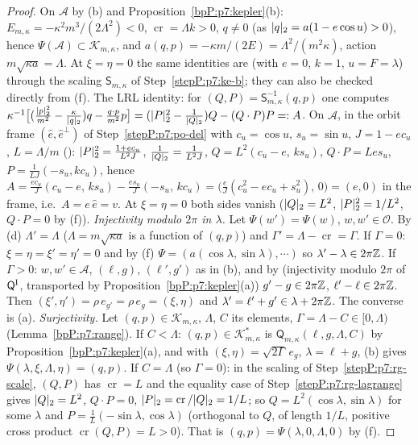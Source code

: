 \begin{proof}
\label{stepP:p7:po-el} On $\mathcal A$ by (b) and Proposition~\ref{bpP:p7:kepler}(b): $E_{m,\kappa}=-\kappa^2m^3/(2\Lambda^2)<0$, $\operatorname{cr}=\Lambda k>0$, $q\ne0$ (as $\lvert q\rvert_2=a(1-e\cos u)>0$), hence $\Psi(\mathcal A)\subset\mathcal K_{m,\kappa}$, and $a(q,p)=-\kappa m/(2E)=\Lambda^2/(m^2\kappa)$, action $m\sqrt{\kappa a}=\Lambda$. At $\xi=\eta=0$ the same identities are  (with $e=0$, $k=1$, $u=F=\lambda$) through the scaling $\mathsf S_{m,\kappa}$ of Step~\ref{stepP:p7:ke-b}; they can also be checked directly from (f). The LRL identity: for $(Q,P)=\mathsf S_{m,\kappa}^{-1}(q,p)$ one computes $\kappa^{-1}\bigl[(\frac{\lvert p\rvert_2^2}{m^2}-\frac\kappa{\lvert q\rvert_2})q-\frac{q\cdot p}{m^2}p\bigr]=(\lvert P\rvert_2^2-\frac1{\lvert Q\rvert_2})Q-(Q\cdot P)P=:A$. On $\mathcal A$, in the orbit frame $(\hat e,\hat e^\perp)$ of Step~\ref{stepP:p7:po-del} with $c_u=\cos u$, $s_u=\sin u$, $J=1-ec_u$, $L=\Lambda/m$ (): $\lvert P\rvert_2^2=\frac{1+ec_u}{L^2J}$, $\frac1{\lvert Q\rvert_2}=\frac1{L^2J}$, $Q=L^2(c_u-e,\,ks_u)$, $Q\cdot P=Les_u$, $P=\frac1{LJ}(-s_u,kc_u)$, hence
$A=\frac{ec_u}J(c_u-e,\,ks_u)-\frac{es_u}{J}(-s_u,\,kc_u)=\bigl(\frac eJ(c_u^2-ec_u+s_u^2),\,0\bigr)=(e,0)$ in the frame, i.e.\ $A=e\,\hat e=v$. At $\xi=\eta=0$ both sides vanish ($\lvert Q\rvert_2=L^2$, $\lvert P\rvert_2^2=1/L^2$, $Q\cdot P=0$ by (f)).
\label{stepP:p7:po-bij} \emph{Injectivity modulo $2\pi$ in $\lambda$.} Let $\Psi(w')=\Psi(w)$, $w,w'\in\mathcal O$. By (d) $\Lambda'=\Lambda$ ($\Lambda=m\sqrt{\kappa a}$ is a function of $(q,p)$) and $\Gamma'=\Lambda-\operatorname{cr}=\Gamma$. If $\Gamma=0$: $\xi=\eta=\xi'=\eta'=0$ and by (f) $\Psi=(a(\cos\lambda,\sin\lambda),\cdots)$ so $\lambda'-\lambda\in2\pi\mathbb{Z}$. If $\Gamma>0$: $w,w'\in\mathcal A$, $(\ell,g)$, $(\ell',g')$ as in (b), and by  (injectivity modulo $2\pi$ of $\mathsf Q^{\rm I}$, transported by Proposition~\ref{bpP:p7:kepler}(a)) $g'-g\in2\pi\mathbb{Z}$, $\ell'-\ell\in2\pi\mathbb{Z}$. Then $(\xi',\eta')=\rho\,e_{g'}=\rho\,e_g=(\xi,\eta)$ and $\lambda'=\ell'+g'\in\lambda+2\pi\mathbb{Z}$. The converse is (a).
\emph{Surjectivity.} Let $(q,p)\in\mathcal K_{m,\kappa}$, $\Lambda$, $C$ its elements, $\Gamma=\Lambda-C\in[0,\Lambda)$ (Lemma~\ref{bpP:p7:range}). If $C<\Lambda$: $(q,p)\in\mathcal K^*_{m,\kappa}$ is $\mathsf Q_{m,\kappa}(\ell,g,\Lambda,C)$ by Proposition~\ref{bpP:p7:kepler}(a), and with $(\xi,\eta)=\sqrt{2\Gamma}\,e_g$, $\lambda=\ell+g$, (b) gives $\Psi(\lambda,\xi,\Lambda,\eta)=(q,p)$. If $C=\Lambda$ (so $\Gamma=0$): in the scaling of Step~\ref{stepP:p7:rg-scale}, $(Q,P)$ has $\operatorname{cr}=L$ and the equality case of Step~\ref{stepP:p7:rg-lagrange} gives $\lvert Q\rvert_2=L^2$, $Q\cdot P=0$, $\lvert P\rvert_2=\operatorname{cr}/\lvert Q\rvert_2=1/L$; so $Q=L^2(\cos\lambda,\sin\lambda)$ for some $\lambda$ and $P=\frac1L(-\sin\lambda,\cos\lambda)$ (orthogonal to $Q$, of length $1/L$, positive cross product $\operatorname{cr}(Q,P)=L>0$). That is $(q,p)=\Psi(\lambda,0,\Lambda,0)$ by (f).

\end{proof}
